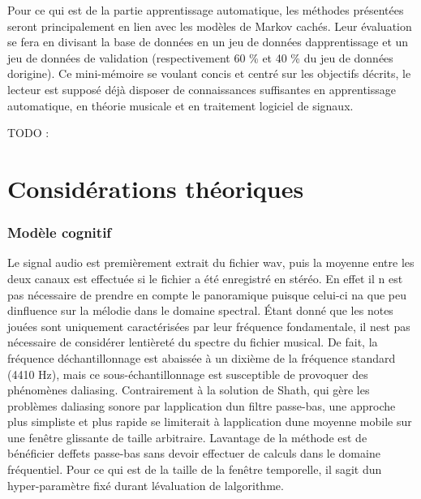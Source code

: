 \documentclass[letterpaper]{article}
\begin{document}
Pour ce qui est de la partie apprentissage automatique, les méthodes présentées seront principalement
en lien avec les modèles de Markov cachés. Leur évaluation se fera en divisant la base de données en
un jeu de données d\textquotesingle apprentissage et un jeu de données de validation (respectivement
60 \% et 40 \% du jeu de données d\textquotesingle origine). Ce mini-mémoire se voulant concis et 
centré sur les objectifs décrits, le lecteur est supposé déjà disposer de connaissances suffisantes en 
apprentissage automatique, en théorie musicale et en traitement logiciel de signaux.

TODO : \citep{SP} \citep{AT}

\section{Considérations théoriques}

\subsubsection{Modèle cognitif}

Le signal audio est premièrement extrait du fichier wav, puis la moyenne entre les 
deux canaux est effectuée si le fichier a été enregistré en stéréo. En effet il n\textquotesingle
est pas nécessaire de prendre en compte le panoramique puisque celui-ci n\textquotesingle a que 
peu d\textquotesingle influence sur la mélodie dans le domaine spectral. 
Étant donné que les notes jouées sont uniquement caractérisées par leur fréquence fondamentale,
il n\textquotesingle est pas nécessaire de considérer l\textquotesingle entièreté du spectre
du fichier musical. De fait, la fréquence d\textquotesingle échantillonnage est abaissée à un dixième 
de la fréquence standard (4410 Hz), mais ce sous-échantillonnage est susceptible de provoquer des
phénomènes d\textquotesingle aliasing. Contrairement à la solution de Sh\textquotesingle ath, 
qui gère les problèmes d\textquotesingle aliasing sonore par l\textquotesingle application 
d\textquotesingle un filtre passe-bas, une approche plus simpliste et plus rapide se limiterait à
l\textquotesingle application d\textquotesingle une moyenne mobile sur une fenêtre glissante
de taille arbitraire. L\textquotesingle avantage de la méthode est de bénéficier d\textquotesingle effets
passe-bas sans devoir effectuer de calculs dans le domaine fréquentiel. Pour ce qui est de la taille
de la fenêtre temporelle, il s\textquotesingle agit d\textquotesingle un hyper-paramètre fixé durant
l\textquotesingle évaluation de l\textquotesingle algorithme.
\end{document}
